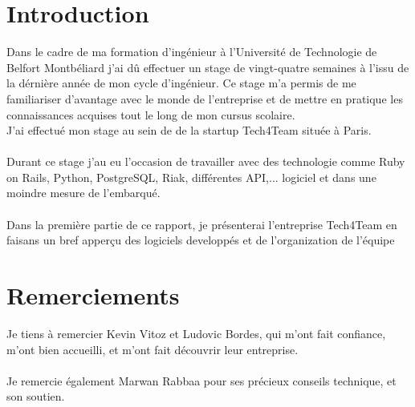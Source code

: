 
\newpage

\section*{Introduction}

Dans le cadre de ma formation d’ingénieur à l’Université de Technologie de Belfort Montbéliard j’ai dû effectuer un stage de vingt-quatre semaines à l’issu de la dérnière année de mon cycle d’ingénieur. Ce stage m'a permis de me familiariser d'avantage avec le monde de l’entreprise et de mettre en pratique les connaissances acquises tout le long de mon cursus scolaire.
\\
J’ai effectué mon stage au sein de de la startup Tech4Team située à Paris.
\\ \\

\indent Durant ce stage j'au eu l'occasion de travailler avec des technologie comme Ruby on Rails, Python, PostgreSQL, Riak, différentes API,...
logiciel et dans une moindre mesure de l'embarqué.
\\ \\
Dans la première partie de ce rapport, je présenterai l’entreprise Tech4Team en faisans un bref apperçu des logiciels developpés et de l'organization de l'équipe


%
%
%

\newpage
\section*{Remerciements}
Je tiens à remercier Kevin Vitoz et Ludovic Bordes, qui m'ont fait confiance, m'ont bien accueilli, et m'ont fait découvrir leur entreprise.
\\ \\ 
Je remercie également Marwan Rabbaa pour ses précieux conseils technique, et son soutien.